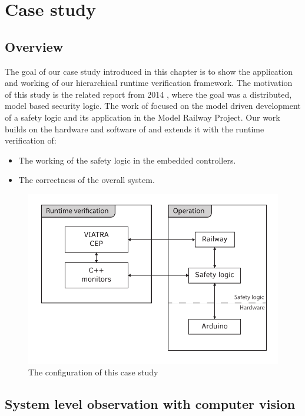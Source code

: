 \chapter{Case study}
\label{chap:case_study}

\section{Overview}

The goal of our case study introduced in this chapter is to show the application and working of our hierarchical runtime verification framework. The motivation of this study is the related report from 2014 \citep{tdk2014}, where the goal was a distributed, model based security logic. The work of \citep{tdk2014} focused on the model driven development of a safety logic and its application in the Model Railway Project. Our work builds on the hardware and software of \citep{tdk2014} and extends it with the runtime verification of:
\begin{itemize}
	\item The working of the safety logic in the embedded controllers.
	\item The correctness of the overall system.
\end{itemize}

\begin{figure}[h]
	\centering
	\includegraphics[width=0.85\linewidth]{include/figures/chapter_6/concept_1}
	\caption{The configuration of this case study}
	\label{fig:case_study:final_marker} 
\end{figure}

\section{System level observation with computer vision}

